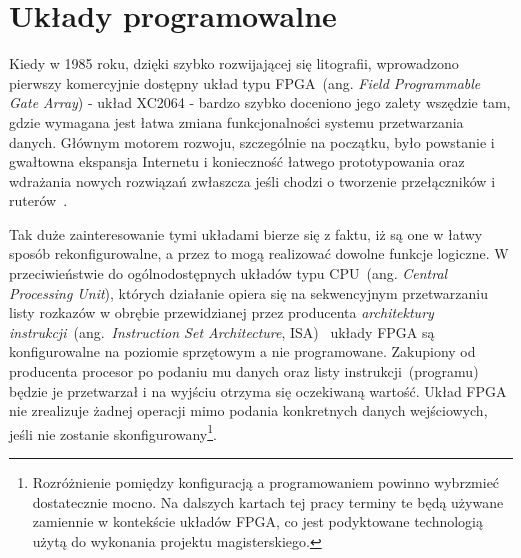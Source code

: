 \chapter{Układy programowalne}
Kiedy w 1985 roku, dzięki szybko rozwijającej się litografii, wprowadzono pierwszy komercyjnie dostępny układ typu FPGA~(ang. \textit{Field Programmable Gate Array}) - układ XC2064 - bardzo szybko doceniono jego zalety wszędzie tam, gdzie wymagana jest łatwa zmiana funkcjonalności systemu przetwarzania danych. Głównym motorem rozwoju, szczególnie na początku, było powstanie i gwałtowna ekspansja Internetu i konieczność łatwego prototypowania oraz wdrażania nowych rozwiązań zwłaszcza jeśli chodzi o tworzenie przełączników i ruterów~\cite{Designing_with_Xilinx}.

Tak duże zainteresowanie tymi układami bierze się z faktu, iż są one w łatwy sposób rekonfigurowalne, a przez to mogą realizować dowolne funkcje logiczne. W przeciwieństwie do ogólnodostępnych układów typu CPU~(ang. \textit{Central Processing Unit}), których działanie opiera się na sekwencyjnym przetwarzaniu listy rozkazów w obrębie przewidzianej przez producenta \textit{architektury instrukcji}~(ang.~\textit{Instruction Set Architecture}, ISA)~\cite{INTEL_ISA} układy FPGA są konfigurowalne na poziomie sprzętowym a nie programowane. Zakupiony od producenta procesor po podaniu mu danych oraz listy instrukcji~(programu) będzie je przetwarzał i na wyjściu otrzyma się oczekiwaną wartość. Układ FPGA nie zrealizuje żadnej operacji mimo podania konkretnych danych wejściowych, jeśli nie zostanie skonfigurowany\footnote{Rozróżnienie pomiędzy konfiguracją a programowaniem powinno wybrzmieć dostatecznie mocno. Na dalszych kartach tej pracy terminy te będą używane zamiennie w kontekście układów FPGA, co jest podyktowane technologią użytą do wykonania projektu magisterskiego.}.

